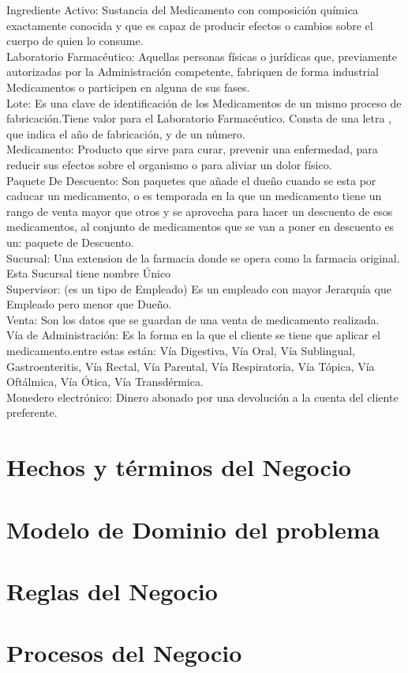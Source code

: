 Ingrediente Activo: Sustancia del Medicamento con composición química exactamente conocida y que es capaz de producir efectos o cambios sobre el cuerpo de quien lo consume.\\

Laboratorio Farmacéutico: Aquellas personas físicas o jurídicas que, previamente autorizadas por la Administración competente, fabriquen de forma industrial Medicamentos o participen en alguna de sus fases.\\

Lote: Es una clave de identificación de los Medicamentos de un mismo proceso de fabricación.Tiene valor para el Laboratorio Farmacéutico. Consta de una letra , que indica el año de fabricación, y de un número.\\

Medicamento: Producto que sirve para curar, prevenir una enfermedad, para reducir sus efectos sobre el organismo o para aliviar un dolor físico.\\

Paquete De Descuento: Son paquetes que añade el dueño cuando se esta por caducar un medicamento, o es temporada en la que un medicamento tiene un rango de venta mayor que otros y se aprovecha para hacer un descuento de esos medicamentos, al conjunto de medicamentos que se van a poner en descuento es un: paquete de Descuento.\\

Sucursal: Una extension de la farmacia donde se opera como la farmacia original.
Esta Sucursal tiene nombre Único \\

Supervisor: (es un tipo de Empleado) Es un empleado con mayor Jerarquía que Empleado pero menor que Dueño.\\

Venta: Son los datos que se guardan de una venta de medicamento realizada.\\

Vía de Administración:  Es la forma en la que el cliente se tiene que aplicar el medicamento.entre estas están: Vía Digestiva, Vía Oral, Vía Sublingual, Gastroenteritis, Vía Rectal, Vía Parental, Vía Respiratoria, Vía Tópica, Vía Oftálmica, Vía Ótica, Vía Transdérmica.\\


Monedero electrónico: Dinero abonado por una devolución a la cuenta del cliente preferente.

\section{Hechos y términos del Negocio}
\section{Modelo de Dominio del problema}
\section{Reglas del Negocio}
\section{Procesos del Negocio}













